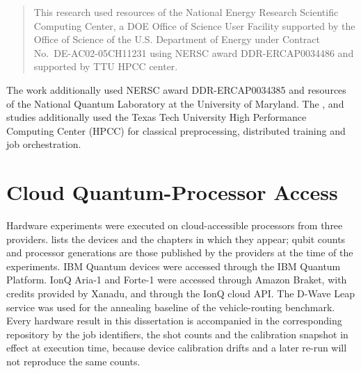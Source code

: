 \begin{quote}
This research used resources of the National Energy Research Scientific Computing Center, a DOE Office of Science User Facility supported by the Office of Science of the U.S. Department of Energy under Contract No.\ DE-AC02-05CH11231 using NERSC award DDR-ERCAP0034486 and supported by TTU HPCC center.
\end{quote}

The \vqt{} work additionally used NERSC award DDR-ERCAP0034385 and resources of the National Quantum Laboratory at the University of Maryland. The \deal{}, \qawa{} and \qpie{} studies additionally used the Texas Tech University High Performance Computing Center (HPCC) for classical preprocessing, distributed training and job orchestration.

\section{Cloud Quantum-Processor Access}\label{sec:apprepro:qpu}

Hardware experiments were executed on cloud-accessible processors from three providers.  lists the devices and the chapters in which they appear; qubit counts and processor generations are those published by the providers at the time of the experiments. IBM Quantum devices were accessed through the IBM Quantum Platform. IonQ Aria-1 and Forte-1 were accessed through Amazon Braket, with credits provided by Xanadu, and through the IonQ cloud API. The D-Wave Leap service was used for the annealing baseline of the \deal{} vehicle-routing benchmark. Every hardware result in this dissertation is accompanied in the corresponding repository by the job identifiers, the shot counts and the calibration snapshot in effect at execution time, because device calibration drifts and a later re-run will not reproduce the same counts.

